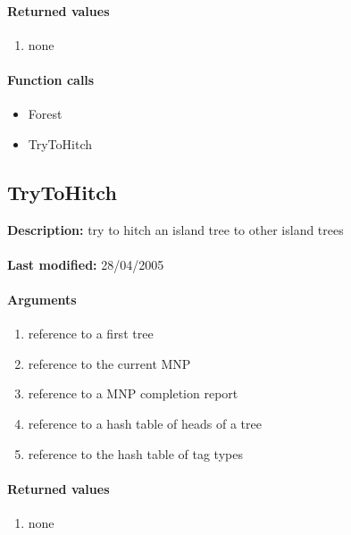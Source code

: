 \paragraph{Returned values}
\begin{enumerate}
\item none
\end{enumerate}

\paragraph{Function calls}
\begin{itemize}
\item Forest
\item TryToHitch
\end{itemize}

\subsection{TryToHitch}
\textbf{Description:} try to hitch an island tree to other island trees\\
\\\textbf{Last modified:} 28/04/2005

\paragraph{Arguments}
\begin{enumerate}
\item reference to a first tree
\item reference to the current MNP
\item reference to a MNP completion report
\item reference to a hash table of heads of a tree
\item reference to the hash table of tag types
\end{enumerate}

\paragraph{Returned values}
\begin{enumerate}
\item none
\end{enumerate}

